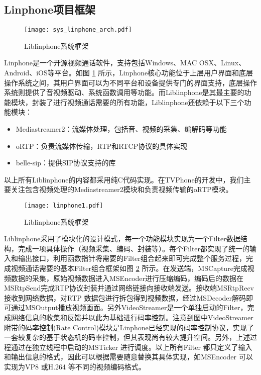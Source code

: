     \subsection{Linphone项目框架}
    
    \begin{figure}[htbp]
      \centering
      \texttt{[image: sys\_linphone\_arch.pdf]}
      \caption{Liblinphone系统框架}
      \label{fig:sys_linphone_arch}
    \end{figure}
    
    Linphone是一个开源视频通话软件，支持包括Windows、MAC OSX、Linux、Android、iOS等平台。如图 \ref{fig:sys_linphone_arch} 所示，Linphone核心功能位于上层用户界面和底层操作系统之间，其用户界面可以为不同平台和设备提供专门的界面支持，底层操作系统则提供了音视频驱动、系统函数调用等功能。而Liblinphone是其最主要的功能模块，封装了进行视频通话需要的所有功能，Liblinphone还依赖于以下三个功能模块：
    \begin{itemize}
        \item Mediastreamer2：流媒体处理，包括音、视频的采集、编解码等功能
        \item oRTP：负责流媒体传输，RTP和RTCP协议的具体实现
        \item belle-sip：提供SIP协议支持的库
    \end{itemize}
    以上所有Liblinphone的内容都采用纯C代码实现。在TVPhone的开发中，我们主要关注包含视频处理的Mediastreamer2模块和负责视频传输的oRTP模块。

    \begin{figure}[htbp]
      \centering
      \texttt{[image: linphone1.pdf]}
      \caption{Liblinphone系统框架}
      \label{fig:linphone1}
    \end{figure}

    Liblinphone采用了模块化的设计模式，每一个功能模块实现为一个Filter数据结构，完成一项具体操作（视频采集、编码、封装等）。每个Filter都实现了统一的输入和输出接口，利用函数指针将需要的Filter组合起来即可完成整个服务过程，完成视频通话需要的基本Filter组合框架如图 \ref{fig:linphone1} 所示。在发送端，MSCapture完成视频数据的采集，原始视频数据进入MSEncoder进行压缩编码，编码后的数据在MSRtpSend完成RTP协议封装并通过网络链接向接收端发送。接收端MSRtpRecv接收到网络数据，对RTP 数据包进行拆包得到视频数据，经过MSDecoder解码即可通过MSOutput播放视频画面。另外VideoStreamer是一个单独启动的Filter，完成网络信息的收集和反馈并以此为基础进行码率控制。注意到图中VideoStreamer附带的码率控制(Rate Control)模块是Linphone已经实现的码率控制协议，实现了一套较复杂的基于状态机的码率控制，但其表现尚有较大提升空间。另外，上述过程通过在独立线程中启动的MSTicker 进行调度。以上所有Filter 都只定义了输入和输出信息的格式，因此可以根据需要随意替换其具体实现，如MSEncoder 可以实现为VP8 或H.264 等不同的视频编码格式。

